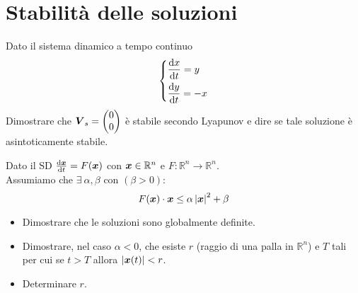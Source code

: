 \section{Stabilità delle soluzioni}%
\begin{ex}
    Dato il sistema dinamico a tempo continuo
    \[\begin{dcases}
        \frac{\text{d} x}{\text{d} t} = y\\
	\frac{\text{d} y}{\text{d} t} = -x
    \end{dcases}\] 
    Dimostrare che $\boldsymbol{V}_s= \begin{pmatrix} 0\\ 0 \end{pmatrix} $ è stabile secondo Lyapunov e dire se tale soluzione è asintoticamente stabile.
\end{ex}
\noindent
\begin{ex}
    Dato il SD $\frac{\text{d} \boldsymbol{x}}{\text{d} t} = F(\boldsymbol{x})$ con $\boldsymbol{x}\in \mathbb{R}^n$ e $F: \mathbb{R}^n\to \mathbb{R}^n$.\\
    Assumiamo che $\exists \ \alpha, \beta$ con $(\beta >0)$:
    \[
	F(\boldsymbol{x})\cdot \boldsymbol{x}\le \alpha\left|\boldsymbol{x}\right|^2+ \beta
    \] 	
    \begin{itemize}
        \item Dimostrare che le soluzioni sono globalmente definite.
	\item Dimostrare, nel caso $\alpha <0$, che esiste $r$ (raggio di una palla in $\mathbb{R}^n$) e $T$ tali per cui se $t>T$ allora $\left|\boldsymbol{x} (t)\right|<r$.
	\item Determinare $r$.
    \end{itemize}

\end{ex}
\noindent

